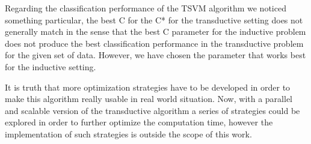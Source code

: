 Regarding the classification performance of the TSVM algorithm we
noticed something particular, the best C for the C{*} for the transductive
setting does not generally match in the sense that the best C parameter
for the inductive problem does not produce the best classification
performance in the transductive problem for the given set of data.
However, we have chosen the parameter that works best for the inductive
setting.

It is truth that more optimization strategies have to be developed
in order to make this algorithm really usable in real world situation.
Now, with a parallel and scalable version of the transductive algorithm
a series of strategies could be explored in order to further optimize
the computation time, however the implementation of such strategies
is outside the scope of this work.




{}


